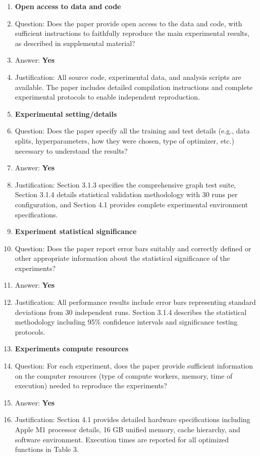 \begin{enumerate}
\item {\bf Open access to data and code}
    \item[] Question: Does the paper provide open access to the data and code, with sufficient instructions to faithfully reproduce the main experimental results, as described in supplemental material?
    \item[] Answer: \textbf{Yes}
    \item[] Justification: All source code, experimental data, and analysis scripts are available. The paper includes detailed compilation instructions and complete experimental protocols to enable independent reproduction.

\item {\bf Experimental setting/details}
    \item[] Question: Does the paper specify all the training and test details (e.g., data splits, hyperparameters, how they were chosen, type of optimizer, etc.) necessary to understand the results?
    \item[] Answer: \textbf{Yes}
    \item[] Justification: Section 3.1.3 specifies the comprehensive graph test suite, Section 3.1.4 details statistical validation methodology with 30 runs per configuration, and Section 4.1 provides complete experimental environment specifications.

\item {\bf Experiment statistical significance}
    \item[] Question: Does the paper report error bars suitably and correctly defined or other appropriate information about the statistical significance of the experiments?
    \item[] Answer: \textbf{Yes}
    \item[] Justification: All performance results include error bars representing standard deviations from 30 independent runs. Section 3.1.4 describes the statistical methodology including 95\% confidence intervals and significance testing protocols.

\item {\bf Experiments compute resources}
    \item[] Question: For each experiment, does the paper provide sufficient information on the computer resources (type of compute workers, memory, time of execution) needed to reproduce the experiments?
    \item[] Answer: \textbf{Yes}
    \item[] Justification: Section 4.1 provides detailed hardware specifications including Apple M1 processor details, 16 GB unified memory, cache hierarchy, and software environment. Execution times are reported for all optimized functions in Table 3.


\end{enumerate}
